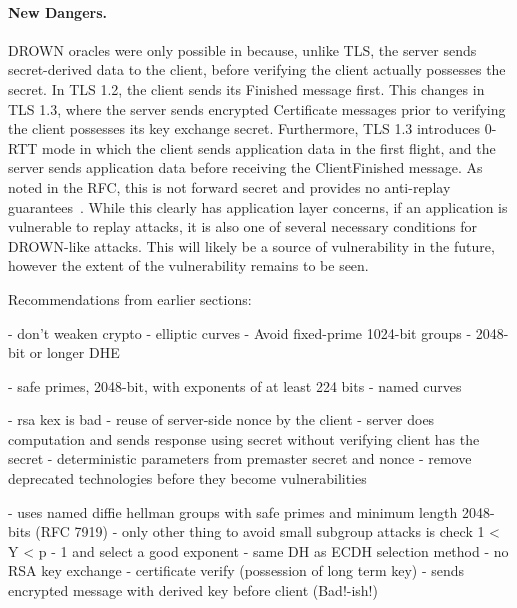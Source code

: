 \paragraph{New Dangers.}
DROWN oracles were only possible in \ssltwo because, unlike TLS, the server
sends secret-derived data to the client, before verifying the client actually
possesses the secret. In TLS 1.2, the client sends its \textsf{Finished}
message first. This changes in TLS 1.3, where the server sends encrypted
\textsf{Certificate} messages prior to verifying the client possesses its key
exchange secret. Furthermore, TLS 1.3 introduces 0-RTT mode in which the
client sends application data in the first flight, and the server sends
application data before receiving the \textsf{ClientFinished} message. As
noted in the RFC, this is not forward secret and provides no anti-replay
guarantees~\cite{rfc8446}. While this clearly has application layer concerns,
if an application is vulnerable to replay attacks, it is also one of several
necessary conditions for DROWN-like attacks. This will likely be a source of
vulnerability in the future, however the extent of the vulnerability remains
to be seen.

Recommendations from earlier sections:

- don't weaken crypto
- elliptic curves
- Avoid fixed-prime 1024-bit groups
- 2048-bit or longer DHE

- safe primes, 2048-bit, with exponents of at least 224 bits
- named curves

- rsa kex is bad
- reuse of server-side nonce by the client
- server does computation and sends response using secret without verifying client has the secret
- deterministic parameters from premaster secret and nonce
- remove deprecated technologies before they become vulnerabilities

- uses named diffie hellman groups with safe primes and minimum length 2048-bits (RFC 7919)
- only other thing to avoid small subgroup attacks is check 1 < Y < p - 1 and select a good exponent
- same DH as ECDH selection method
- no RSA key exchange
- certificate verify (possession of long term key)
- sends encrypted message with derived key before client (Bad!-ish!)

\fi

%
%

